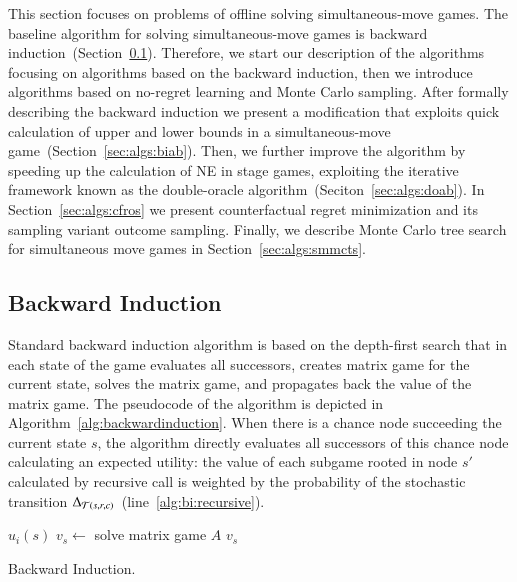 This section focuses on problems of offline solving simultaneous-move games. 
The baseline algorithm for solving simultaneous-move games is backward induction~(Section~\ref{sec:algs:bi}).
Therefore, we start our description of the algorithms focusing on algorithms based on the backward induction, then we introduce algorithms based on no-regret learning and Monte Carlo sampling.
After formally describing the backward induction we present a modification that exploits quick calculation of upper and lower bounds in a simultaneous-move game~(Section~\ref{sec:algs:biab}).
Then, we further improve the algorithm by speeding up the calculation of NE in stage games, exploiting the iterative framework known as the double-oracle algorithm~(Seciton~\ref{sec:algs:doab}).
In Section~\ref{sec:algs:cfros} we present counterfactual regret minimization and its sampling variant outcome sampling. 
Finally, we describe Monte Carlo tree search for simultaneous move games in Section~\ref{sec:algs:smmcts}. 

\subsection{Backward Induction}\label{sec:algs:bi}
Standard backward induction algorithm is based on the depth-first search that in each state of the game evaluates all successors, creates matrix game for the current state, solves the matrix game, and propagates back the value of the matrix game. The pseudocode of the algorithm is depicted in Algorithm~\ref{alg:backwardinduction}. When there is a chance node succeeding the current state $s$, the algorithm directly evaluates all successors of this chance node calculating an expected utility: the value of each subgame rooted in node $s'$ calculated by recursive call is weighted by the probability of the stochastic transition $\Delta_{\mathcal{T}(s,r,c)}$~(line~\ref{alg:bi:recursive}).

\begin{algorithm2e}[t]
\small
{}
 {\Return $u_i(s)$} \label{alg:bi:stop1}
$v_s \leftarrow$ solve matrix game $A$\;
\Return $v_s$ \label{alg:bi:stop2}
\caption{Backward Induction.}\label{alg:backwardinduction}
\end{algorithm2e}

